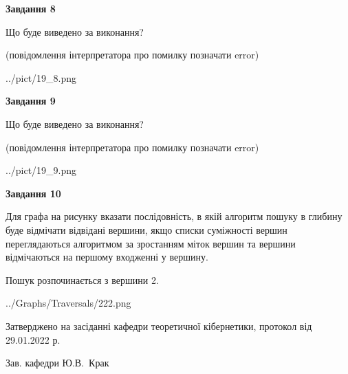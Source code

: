\documentclass[12pt, ukrainian]{article}
\begin{document}
{\begin {large}
{\begin {center}\textbf{Завдання 8}\end {center}}\par
Що буде виведено за виконання?\par
 (повідомлення інтерпретатора про помилку позначати error)
\begin{center}
	{../pict/19_8.png}
\end{center}
\newpage

{\begin {center}\textbf{Завдання 9}\end {center}}\par
Що буде виведено за виконання?\par
 (повідомлення інтерпретатора про помилку позначати error)\par
\begin{center}
	{../pict/19_9.png}
\end{center}
\newpage

{\begin {center}\textbf{Завдання 10}\end {center}}\par
Для графа на рисунку вказати послідовність, в якій алгоритм пошуку в глибину буде відмічати відвідані вершини, якщо списки суміжності вершин переглядаються алгоритмом за зростанням міток вершин та вершини відмічаються на першому вход\-женні у вершину.\par
Пошук розпочинається з вершини 2.\par

\begin{center}
	{../Graphs/Traversals/222.png}
\end{center}\par
\newpage


\end {large}
}
{\smallskip \begin {small} Затверджено на засіданні кафедри теоретичної кібернетики, протокол  від   29.01.2022 р.\par\smallskip\smallskip
{\parbox {6.5 cm}{Зав. кафедри \dotfill Ю.В.~Крак}} \end{small}}
\end{document}
